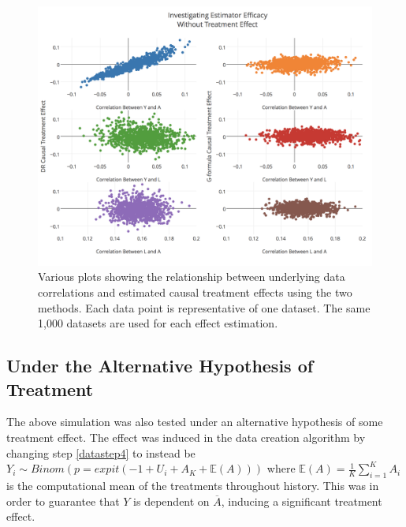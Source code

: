\begin{figure}[h!]
\includegraphics[width = \linewidth]{figures/correlation.png}
\caption[Scatterplots of relationships between estimates and data correlations under the null hypothesis]{Various plots showing the relationship between underlying data correlations and estimated causal treatment effects using the two methods.  Each data point is representative of one dataset.  The same 1,000 datasets are used for each effect estimation.}
\label{correlation}
\end{figure}

\subsection{Under the Alternative Hypothesis of Treatment} \label{alternative}
The above simulation was also tested under an alternative hypothesis of some treatment effect.  The effect was induced in the data creation algorithm by changing step \ref{datastep4} to instead be $Y_i \sim Binom(p = expit(-1+U_i + A_K + \mathbb{E}(A)))$ where $\mathbb{E}(A) = \frac{1}{K} \sum_{i=1}^K A_i $ is the computational mean of the treatments throughout history.  This was in order to guarantee that $Y$ is dependent on $\overline{A}$, inducing a significant treatment effect.  

